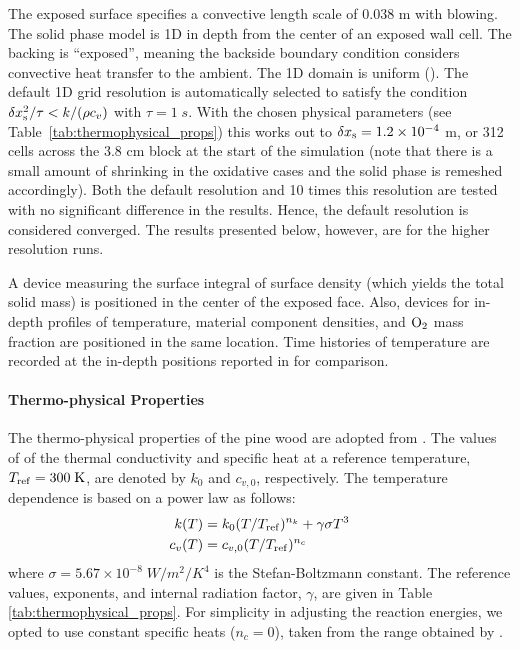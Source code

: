The exposed surface specifies a convective length scale of 0.038 m with blowing. The solid phase model is 1D in depth from the center of an exposed wall cell.  The backing is ``exposed'', meaning the backside boundary condition considers convective heat transfer to the ambient.  The 1D domain is uniform ().  The default 1D grid resolution is automatically selected to satisfy the condition $\delta x_{\rm s}^2/\tau < k/(\rho c_v)$ with $\tau=1\;\unit{s}$.  With the chosen physical parameters (see Table~\ref{tab:thermophysical_props}) this works out to $\delta x_{\rm s} = 1.2 \times 10^{-4}$ m, or 312 cells across the 3.8 cm block at the start of the simulation (note that there is a small amount of shrinking in the oxidative cases and the solid phase is remeshed accordingly).  Both the default resolution and 10 times this resolution are tested with no significant difference in the results.  Hence, the default resolution is considered converged.  The results presented below, however, are for the higher resolution runs.

A device measuring the surface integral of surface density (which yields the total solid mass) is positioned in the center of the exposed face.  Also, devices for in-depth profiles of temperature, material component densities, and ${\rm O}_2$ mass fraction are positioned in the same location.  Time histories of temperature are recorded at the in-depth positions reported in \cite{Kashiwagi:1987} for comparison.

\paragraph{Thermo-physical Properties}

The thermo-physical properties of the pine wood are adopted from \cite{Lautenberger:2009}.  The values of of the thermal conductivity and specific heat at a reference temperature, $T_{\rm ref}=300 \;\unit{K}$, are denoted by $k_0$ and $c_{v,0}$, respectively. The temperature dependence is based on a power law as follows:
\begin{align}
k(T)   &= k_0 (T/T_{\rm ref})^{n_k} + \gamma \sigma T^3 \\
c_v(T) &= c_{v,0} (T/T_{\rm ref})^{n_c}
\end{align}
where $\sigma=5.67\times10^{-8} \;\unit{W/m^2/K^4}$ is the Stefan-Boltzmann constant. The reference values, exponents, and internal radiation factor, $\gamma$, are given in Table \ref{tab:thermophysical_props}.  For simplicity in adjusting the reaction energies, we opted to use constant specific heats ($n_c=0$), taken from the range obtained by \cite{Lautenberger:2009}.

